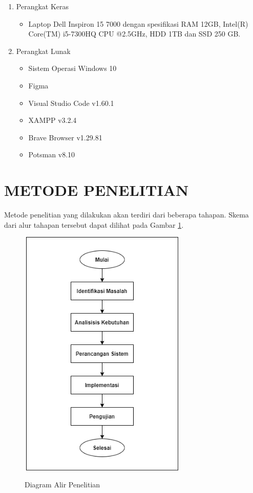 \begin{enumerate}
\item Perangkat Keras
	\begin{itemize}
	\item Laptop Dell Inspiron 15 7000 dengan spesifikasi RAM 12GB, Intel(R) Core(TM) i5-7300HQ CPU @2.5GHz, HDD 1TB dan SSD 250 GB.
	\end{itemize}

\item Perangkat Lunak
	\begin{itemize}
	\item Sistem Operasi Windows 10
	\item Figma
	\item Visual Studio Code v1.60.1
	\item XAMPP v3.2.4
	\item Brave Browser v1.29.81
	\item Potsman v8.10
	\end{itemize}
\end{enumerate}

\section{\uppercase{METODE PENELITIAN}}
Metode penelitian yang dilakukan akan terdiri dari beberapa tahapan. Skema dari alur tahapan tersebut dapat dilihat pada Gambar \ref{alur_penelitian}.

\begin{figure}[H]
\centering
{\includegraphics [width = 8cm, height= 12cm]{gambar/flowchart_proposal}}
\caption{Diagram Alir Penelitian}
\label{alur_penelitian}
\end{figure}


